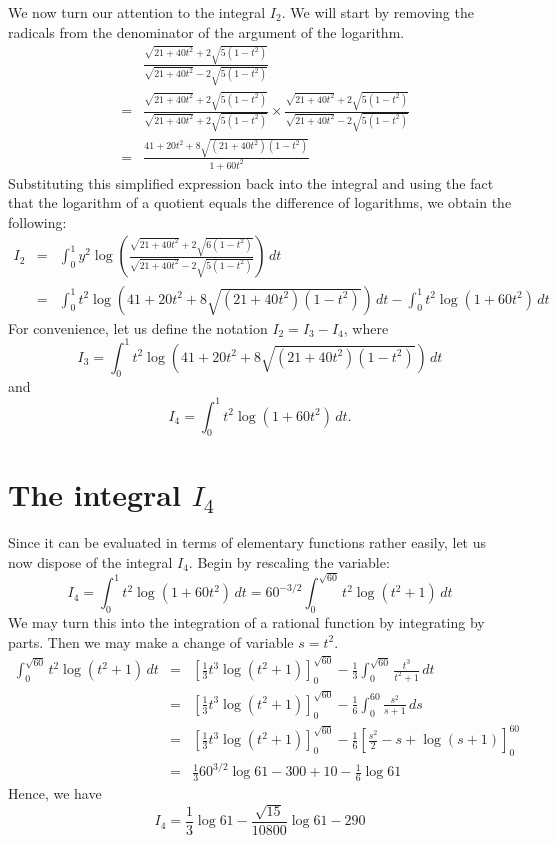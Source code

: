 \documentclass[12pt]{article}
\begin{document}
We now turn our attention to the integral $I_2$.  We will start by removing the radicals from the denominator of the argument of the logarithm.
\begin{eqnarray*}
&& \frac{\sqrt{21 + 40 t^2} + 2 \sqrt{5(1 - t^2)}}{\sqrt{21 + 40 t^2} - 2 \sqrt{5(1 - t^2)}} \\ 
&=& \frac{\sqrt{21 + 40 t^2} + 2 \sqrt{5(1 - t^2)}}{\sqrt{21 + 40 t^2} + 2 \sqrt{5(1 - t^2)}} \times \frac{\sqrt{21 + 40 t^2} + 2 \sqrt{5(1 - t^2)}}{\sqrt{21 + 40 t^2} - 2 \sqrt{5(1 - t^2)}} \\
&=& \frac{41 + 20 t^2 + 8\sqrt{(21 + 40 t^2) (1 - t^2)}}{1 + 60 t^2}
\end{eqnarray*}
Substituting this simplified expression back into the integral and using the fact that the logarithm of a quotient equals the difference of logarithms, we obtain the following: 
\begin{eqnarray*}
I_2 &=& \int_0^1 y^2 \log\left( \frac{\sqrt{21 + 40 t^2} + 2 \sqrt{6 (1 - t^2)}}{\sqrt{21 + 40 t^2} - 2 \sqrt{5 (1 - t^2)}} \right) \, dt \\
&=& \int_0^1 t^2 \log \left( 41 + 20 t^2 + 8\sqrt{(21 + 40 t^2) (1 - t^2)} \right) \, dt - \int_0^1 t^2 \log (1 + 60 t^2) \, dt
\end{eqnarray*}
For convenience, let us define the notation $I_2 = I_3 - I_4$, where
 $$I_3 = \int_0^1 t^2 \log \left( 41 + 20 t^2 + 8\sqrt{(21 + 40 t^2) (1 - t^2)}\right) \, dt$$
and
 $$I_4 = \int_0^1 t^2 \log (1 + 60 t^2) \, dt.$$

\section{The integral $I_4$}

Since it can be evaluated in terms of elementary functions rather easily, let us now dispose of the integral $I_4$.  Begin by rescaling the variable: 
 \[I_4 = \int_0^1 t^2 \log (1 + 60 t^2) \, dt  =
60^{-3/2} \int_0^{\sqrt{60}} t^2 \log (t^2 + 1) \, dt  \]
We may turn this into the integration of a rational function by integrating by parts.  Then we may make a change of variable $s = t^2$.
\begin{eqnarray*} \int_0^{\sqrt{60}} t^2 \log (t^2 + 1) \, dt &=& \left[ \frac{1}{3} t^3 \log (t^2 + 1) \right]_0^{\sqrt{60}} - \frac{1}{3} \int_0^{\sqrt{60}} \frac{t^3}{t^2 + 1} \, dt \\ &=& \left[ \frac{1}{3} t^3 \log (t^2 + 1) \right]_0^{\sqrt{60}} - \frac{1}{6} \int_0^{60} \frac{s^2}{s + 1} \, ds \\ &=& \left[ \frac{1}{3} t^3 \log (t^2 + 1) \right]_0^{\sqrt{60}} - \frac{1}{6} \left[ \frac{s^2}{2} - s +\log (s + 1) \right]_0^{60} \\ &=& \frac{1}{3} 60^{3/2} \log 61 - 300 + 10 - \frac{1}{6} \log 61 \end{eqnarray*}
Hence, we have
 \[I_4 = \frac{1}{3} \log 61 - \frac{\sqrt{15}}{10800} \log 61 - 290\]
\end{document}
